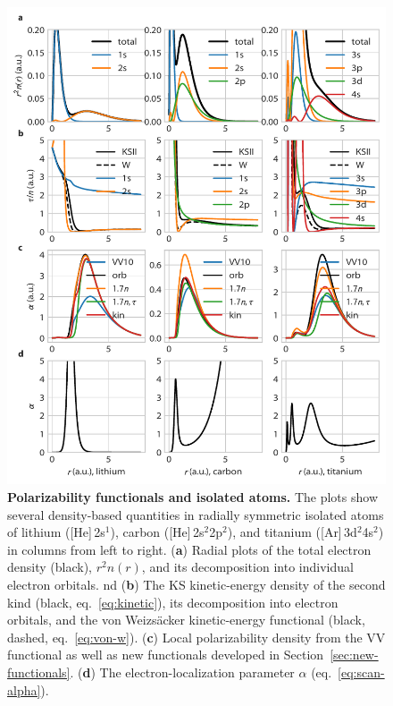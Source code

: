 \begin{figure}
\includegraphics{media/atomic-densities.pdf}
\caption{\textbf{Polarizability functionals and isolated atoms.}
The plots show several density-based quantities in radially symmetric isolated atoms of lithium ([He]\,2s$^1$), carbon ([He]\,2s$^2$2p$^2$), and titanium ([Ar]\,3d$^2$4s$^2$) in columns from left to right.
(\textbf a) Radial plots of the total electron density (black), $r^2n(r)$, and its decomposition into individual electron orbitals.
nd 
(\textbf b) The KS kinetic-energy density of the second kind (black, eq.~\ref{eq:kinetic}), its decomposition into electron orbitals, and the von Weizsäcker kinetic-energy functional (black, dashed, eq.~\ref{eq:von-w}).
(\textbf c) Local polarizability density from the VV functional as well as new functionals developed in Section~\ref{sec:new-functionals}.
(\textbf d) The electron-localization parameter $\alpha$ (eq.~\ref{eq:scan-alpha}).
}\label{fig:atomic-densities}
\end{figure}

